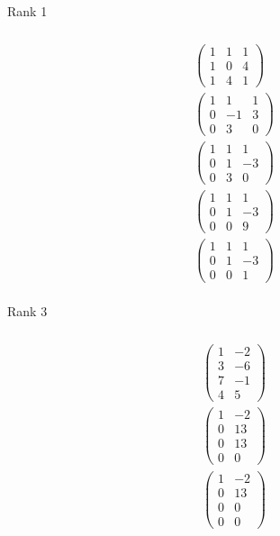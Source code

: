 \documentclass{article}
\begin{document}
Rank 1

\setcounter{subsubsection}{4}
\subsubsection{}

\begin{align*}
  \begin{pmatrix}
    1 & 1 & 1 \\
    1 & 0 & 4 \\
    1 & 4 & 1
  \end{pmatrix} \\
  \begin{pmatrix}
    1 & 1  & 1 \\
    0 & -1 & 3 \\
    0 & 3  & 0
  \end{pmatrix} \\
  \begin{pmatrix}
    1 & 1 & 1  \\
    0 & 1 & -3 \\
    0 & 3 & 0
  \end{pmatrix} \\
  \begin{pmatrix}
    1 & 1 & 1  \\
    0 & 1 & -3 \\
    0 & 0 & 9
  \end{pmatrix} \\
  \begin{pmatrix}
    1 & 1 & 1  \\
    0 & 1 & -3 \\
    0 & 0 & 1
  \end{pmatrix} \\
\end{align*}

Rank 3

\setcounter{subsubsection}{6}
\subsubsection{}

\begin{align*}
  \begin{pmatrix}
    1 & -2 \\
    3 & -6 \\
    7 & -1 \\
    4 & 5
  \end{pmatrix} \\
  \begin{pmatrix}
    1 & -2 \\
    0 & 13 \\
    0 & 13 \\
    0 & 0
  \end{pmatrix} \\
  \begin{pmatrix}
    1 & -2 \\
    0 & 13 \\
    0 & 0  \\
    0 & 0
  \end{pmatrix} \\
\end{align*}
\end{document}
